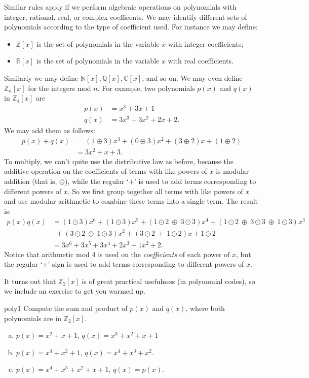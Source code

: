 Similar rules apply if we perform algebraic operations on polynomials with integer, rational, real, or complex coefficents. We may identify different sets of polynomials according to the type of coefficient used. For instance we may define:
\begin{itemize}
\item
$\mathbb{Z}[x]$ is the set of polynomials in the variable $x$ with integer coefficients;
\item
$\mathbb{R}[x]$ is the set of polynomials in the variable $x$ with real coefficients.
\end{itemize}
Similarly we may define $\mathbb{N}[x], \mathbb{Q}[x], \mathbb{C}[x]$, and so on. We may even define $\mathbb{Z}_n[x]$ for the integers mod $n$. For example, two polynomials $p(x)$ and $q(x)$ in $\mathbb{Z}_4[x]$ are
\begin{align*} 
p(x) & = x^3 + 3x +1 \\
q(x) & = 3x^3 + 3x^2 + 2x +2.
\end{align*}
We may add them as follows:
\begin{align*}
p(x) + q(x) &= (1\oplus 3)x^3 + (0\oplus 3)x^2 + (3\oplus 2)x + (1\oplus 2)\\
&= 3x^2 + x + 3.
\end{align*}
To multiply, we can't quite use the distributive law as before, because the additive operation on the coefficients of terms with like powers of $x$ is modular addition (that is, $\oplus$), while the regular `$+$' is used to add terms corresponding to different powers of $x$.  So we first group together all terms with like powers of $x$ and use modular arithmetic to combine  these terms into a single term.  The result is:
\begin{align*}
p(x)  q(x) 
& =  (1 \odot 3)x^6 + (1 \odot 3)x^5 + (1\odot2~\oplus~ 3\odot 3)x^4 + (1\odot 2 ~\oplus~ 3\odot 3 ~\oplus~  1 \odot 3)x^3 \\
&~~+ (3 \odot 2 ~\oplus~  1 \odot 3)x^2 + (3 \odot 2 ~+ ~1 \odot 2)x + 1\odot 2 \\
& = 3x^6 + 3x^5 + 3x^4 + 2x^3 + 1x^2 + 2.
\end{align*}
Notice that arithmetic mod 4 is used on the \emph{coefficients} of each power of $x$, but  the regular `+' sign is used to add terms corresponding to different powers of $x$.  

It turns out that $\mathbb{Z}_2[x]$ is of great practical usefulness (in polynomial codes), so we include an exercise to get you warmed up.

\begin{exercise}{poly1}
Compute the sum and product of $p(x)$ and $q(x)$, where both polynomials are in $\mathbb{Z}_2[x]$.
\begin{enumerate}[(a)]
\item
$p(x)= x^2 + x + 1$, $q(x)=x^3 +x^2+x+1$
\item
$p(x)= x^4 + x^2+1$, $q(x)=x^4 +x^3+x^2$.
\item
$p(x)= x^4 + x^3+x^2+x+1$, $q(x)=p(x)$.
\end{enumerate}
\end{exercise}

